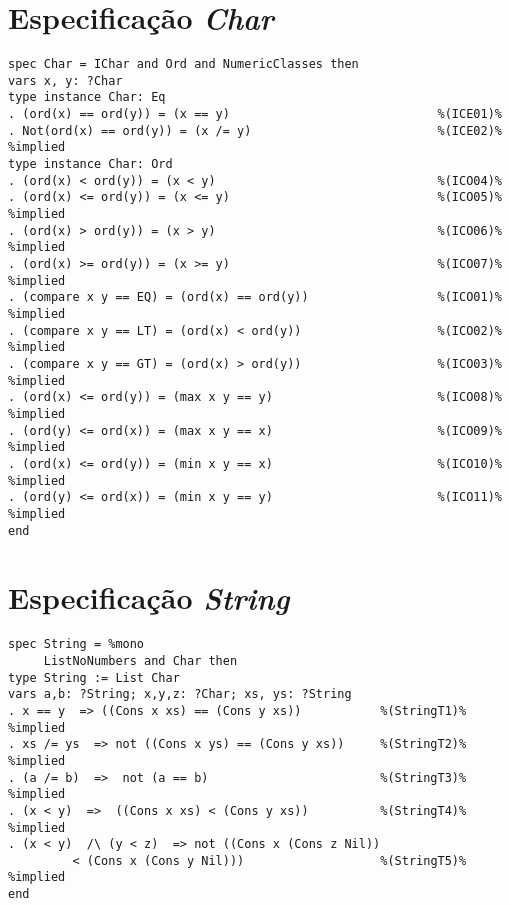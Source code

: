 \section{Especificação \textit{Char}}
\label{appendix:lazySpec:char}
\begin{Verbatim}
spec Char = IChar and Ord and NumericClasses then
vars x, y: ?Char
type instance Char: Eq
. (ord(x) == ord(y)) = (x == y)                             %(ICE01)%
. Not(ord(x) == ord(y)) = (x /= y)                          %(ICE02)% %implied
type instance Char: Ord
. (ord(x) < ord(y)) = (x < y)                               %(ICO04)%
. (ord(x) <= ord(y)) = (x <= y)                             %(ICO05)% %implied
. (ord(x) > ord(y)) = (x > y)                               %(ICO06)% %implied
. (ord(x) >= ord(y)) = (x >= y)                             %(ICO07)% %implied
. (compare x y == EQ) = (ord(x) == ord(y))                  %(ICO01)% %implied
. (compare x y == LT) = (ord(x) < ord(y))                   %(ICO02)% %implied
. (compare x y == GT) = (ord(x) > ord(y))                   %(ICO03)% %implied
. (ord(x) <= ord(y)) = (max x y == y)                       %(ICO08)% %implied
. (ord(y) <= ord(x)) = (max x y == x)                       %(ICO09)% %implied
. (ord(x) <= ord(y)) = (min x y == x)                       %(ICO10)% %implied
. (ord(y) <= ord(x)) = (min x y == y)                       %(ICO11)% %implied
end
\end{Verbatim}

\section{Especificação \textit{String}}
\label{appendix:lazySpec:string}
\begin{Verbatim}
spec String = %mono
     ListNoNumbers and Char then
type String := List Char
vars a,b: ?String; x,y,z: ?Char; xs, ys: ?String
. x == y  => ((Cons x xs) == (Cons y xs))           %(StringT1)% %implied
. xs /= ys  => not ((Cons x ys) == (Cons y xs))     %(StringT2)% %implied
. (a /= b)  =>  not (a == b)                        %(StringT3)% %implied
. (x < y)  =>  ((Cons x xs) < (Cons y xs))          %(StringT4)% %implied
. (x < y)  /\ (y < z)  => not ((Cons x (Cons z Nil)) 
         < (Cons x (Cons y Nil)))                   %(StringT5)% %implied
end
\end{Verbatim}

